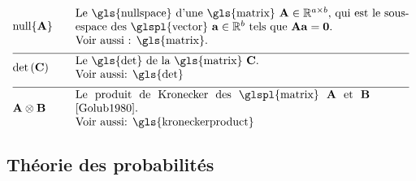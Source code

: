 \begin{align}
	&{\rm null}\{ \mA\}& \quad &  \parbox{.85\textwidth}{Le \gls{nullspace} d'une \gls{matrix} $\mathbf{A} \in \mathbb{R}^{a \times b}$, 
	qui est le sous-espace des \glspl{vector} $\va \in \mathbb{R}^{b}$ tels que $\mA \va = \mathbf{0}$.
		\\ Voir aussi : \gls{matrix}. }\nonumber \\[2mm] \hline \nonumber\\[-5mm]
	&\determinant{\mC} &\quad & \parbox{.75\textwidth}{Le \gls{det} de la \gls{matrix} $\mC$. \\ Voir aussi: \gls{det}} \nonumber \\[2mm] \hline \nonumber\\[-5mm]
	&\mathbf{A} \otimes \mathbf{B} &\quad & \parbox{.75\textwidth}{Le produit de Kronecker des \glspl{matrix} $\mathbf{A}$ et $\mathbf{B}$ \cite{Golub1980}. \\ Voir aussi: \gls{kroneckerproduct}} \nonumber
\end{align}

\newpage
\subsection*{Théorie des probabilités} 

